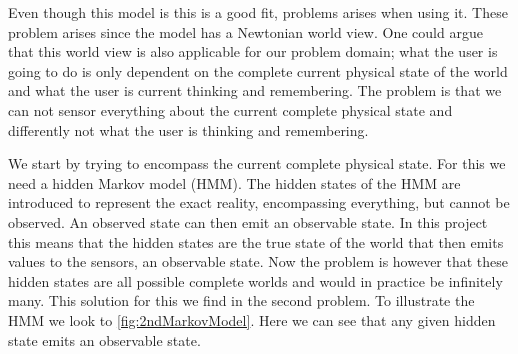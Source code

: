 Even though this model is this is a good fit, problems arises when using it. These problem arises since the model has a Newtonian world view. One could argue that this world view is also applicable for our problem domain; what the user is going to do is only dependent on the complete current physical state of the world and what the user is current thinking and remembering. The problem is that we can not sensor everything about the current complete physical state and differently not what the user is thinking and remembering.

We start by trying to encompass the current complete physical state. For this we need a hidden Markov model (HMM). The hidden states of the HMM are introduced to represent the exact reality, encompassing everything, but cannot be observed. An observed state can then emit an observable state. In this project this means that the hidden states are the true state of the world that then emits values to the sensors, an observable state. Now the problem is however that these hidden states are all possible complete worlds and would in practice be infinitely many. This solution for this we find in the second problem. To illustrate the HMM we look to \cref{fig:2ndMarkovModel}. Here we can see that any given hidden state emits an observable state. 


